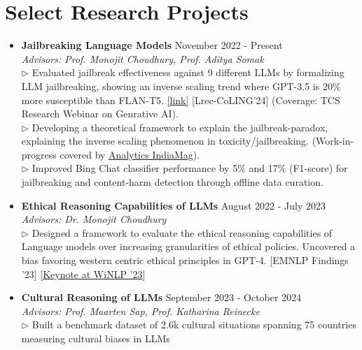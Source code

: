 \documentclass[11pt,letterpaper]{article}
\begin{document}
\section*{Select Research Projects}
\begin{itemize}[leftmargin=*,label={},itemsep=6pt]
    \item \textbf{Jailbreaking Language Models} \hfill November 2022 - Present\\
        \textit{Advisors: Prof. Monojit Choudhury, Prof. Aditya Somak}\\
        $\triangleright$ 
            Evaluated jailbreak effectiveness against 9 different LLMs by formalizing LLM jailbreaking, showing an inverse scaling trend where GPT-3.5 is 20\% more susceptible than FLAN-T5.  \href{https://aclanthology.org/2024.lrec-main.1462/}{[link]} [Lrec-CoLING'24] (Coverage: TCS Research Webinar on Genrative AI).
        \\
        $\triangleright$ 
            Developing a theoretical framework to explain the jailbreak-paradox, explaining the inverse scaling phenomenon in toxicity/jailbreaking. (Work-in-progress covered by \href{https://analyticsindiamag.com/}{Analytics IndiaMag}).
        \\
        $\triangleright$ 
            Improved Bing Chat classifier performance by 5\% and 17\% (F1-score) for jailbreaking and content-harm detection through offline data curation.
        \\
    \item \textbf{Ethical Reasoning Capabilities of LLMs} \hfill August 2022 - July 2023\\
        \textit{Advisors: Dr. Monojit Choudhury}\\
        $\triangleright$ 
            Designed a framework to evaluate the ethical reasoning capabilities of Language models over increasing granularities of ethical policies. Uncovered a bias favoring western centric ethical principles in GPT-4. [EMNLP Findings '23] [\href{https://2023.winlp.org/schedule/}{Keynote at WiNLP '23}]
        \\
    \item \textbf{Cultural Reasoning of LLMs} \hfill September 2023 - October 2024\\
        \textit{Advisors: Prof. Maarten Sap, Prof. Katharina Reinecke}\\
        $\triangleright$ 
            Built a benchmark dataset of 2.6k cultural situations spanning 75 countries measuring cultural biases in LLMs
        \\

\end{itemize}
\end{document}
